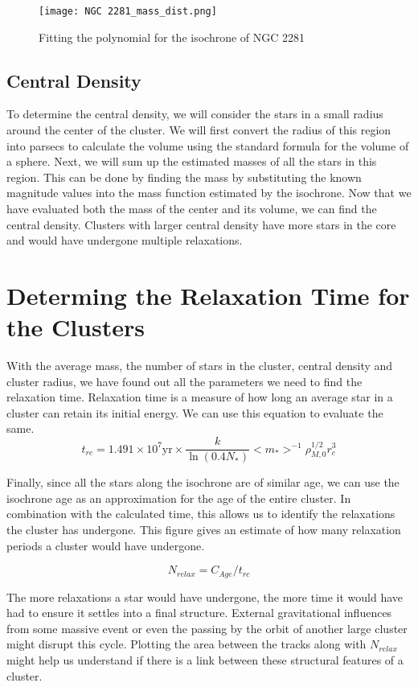 \begin{figure}[h]
	\centering
	\texttt{[image: NGC 2281\_mass\_dist.png]}
	\caption{Fitting the polynomial for the isochrone of NGC 2281}
	\label{fig:im7}
\end{figure}

\subsection{Central Density}
To determine the central density, we will consider the stars in a small radius around the center of the cluster. We will first convert the radius of this region into parsecs to calculate the volume using the standard formula for the volume of a sphere. Next, we will sum up the estimated masses of all the stars in this region. This can be done by finding the mass by substituting the known magnitude values into the mass function estimated by the isochrone. Now that we have evaluated both the mass of the center and its volume, we can find the central density. Clusters with larger central density have more stars in the core and would have undergone multiple relaxations.

\section{Determing the Relaxation Time for the Clusters}
With the average mass, the number of stars in the cluster, central density and cluster radius, we have found out all the parameters we need to find the relaxation time. Relaxation time is a measure of how long an average star in a cluster can retain its initial energy. We can use this equation to evaluate the same.
$$t_{rc} = 1.491 \times 10^7 \text{yr} \times \frac{k}{\ln(0.4 N_*)} <m_*>^{-1} \rho_{M, 0}^{1/2} r_c^3$$

Finally, since all the stars along the isochrone are of similar age, we can use the isochrone age as an approximation for the age of the entire cluster. In combination with the calculated time, this allows us to identify the relaxations the cluster has undergone. This figure gives an estimate of how many relaxation periods a cluster would have undergone.

$$N_{relax} = C_{Age}/t_{rc}$$

The more relaxations a star would have undergone, the more time it would have had to ensure it settles into a final structure. External gravitational influences from some massive event or even the passing by the orbit of another large cluster might disrupt this cycle. Plotting the area between the tracks along with $N_{relax}$ might help us understand if there is a link between these structural features of a cluster.
